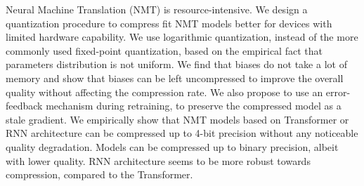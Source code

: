 Neural Machine Translation (NMT) is resource-intensive. We design a quantization procedure to compress fit NMT models better for devices with limited hardware capability. We use logarithmic quantization, instead of the more commonly used fixed-point quantization, based on the empirical fact that parameters distribution is not uniform. We find that biases do not take a lot of memory and show that biases can be left uncompressed to improve the overall quality without affecting the compression rate. We also propose to use an error-feedback mechanism during retraining, to preserve the compressed model as a stale gradient. We empirically show that NMT models based on Transformer or RNN architecture can be compressed up to 4-bit precision without any noticeable quality degradation. Models can be compressed up to binary precision, albeit with lower quality. RNN architecture seems to be more robust towards compression, compared to the Transformer.
